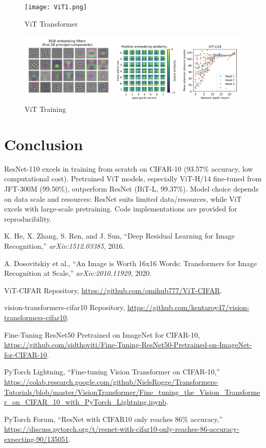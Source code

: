 \documentclass[UTF8]{report}
\theoremstyle{MyLineTheoremStyle} %
\theoremstyle{MyBlockTheoremStyle} %
\theoremstyle{MySubsubsectionStyle} %
\begin{document}
\begin{figure}[H]
    \centering
    \texttt{[image: ViT1.png]}
    \caption{ViT Transformer}
    \label{fig:vit_transformer}
\end{figure}

\begin{figure}[H]
    \centering
    \includegraphics[width=1.0\textwidth]{ViT2.png}
    \caption{ViT Training}
    \label{fig:vit_training}
\end{figure}


\section*{Conclusion}
ResNet-110 excels in training from scratch on CIFAR-10 (93.57\% accuracy, low computational cost). Pretrained ViT models, especially ViT-H/14 fine-tuned from JFT-300M (99.50\%), outperform ResNet (BiT-L, 99.37\%). Model choice depends on data scale and resources: ResNet suits limited data/resources, while ViT excels with large-scale pretraining. Code implementations are provided for reproducibility.

\begin{thebibliography}{9}
K. He, X. Zhang, S. Ren, and J. Sun, ``Deep Residual Learning for Image Recognition,'' \textit{arXiv:1512.03385}, 2016.

A. Dosovitskiy et al., ``An Image is Worth 16x16 Words: Transformers for Image Recognition at Scale,'' \textit{arXiv:2010.11929}, 2020.

ViT-CIFAR Repository, \url{https://github.com/omihub777/ViT-CIFAR}.

vision-transformers-cifar10 Repository, \url{https://github.com/kentaroy47/vision-transformers-cifar10}.

Fine-Tuning ResNet50 Pretrained on ImageNet for CIFAR-10, \url{https://github.com/sidthoviti/Fine-Tuning-ResNet50-Pretrained-on-ImageNet-for-CIFAR-10}.

PyTorch Lightning, ``Fine-tuning Vision Transformer on CIFAR-10,'' \url{https://colab.research.google.com/github/NielsRogge/Transformers-Tutorials/blob/master/VisionTransformer/Fine_tuning_the_Vision_Transformer_on_CIFAR_10_with_PyTorch_Lightning.ipynb}.

PyTorch Forum, ``ResNet with CIFAR10 only reaches 86\% accuracy,'' \url{https://discuss.pytorch.org/t/resnet-with-cifar10-only-reaches-86-accuracy-expecting-90/135051}.
\end{thebibliography}
\end{document}
